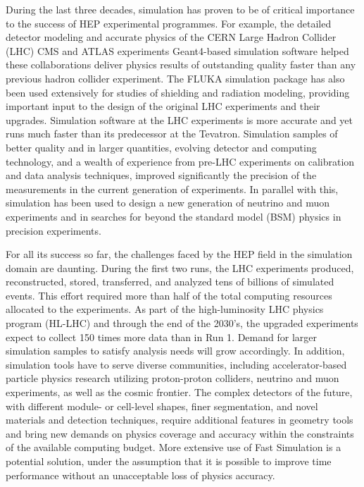 \documentclass[12pt,a4paper]{article}
\begin{document}
During the last three decades, simulation has proven to be of critical
importance to the success of HEP experimental programmes. For example,
the detailed detector modeling and accurate physics of the CERN Large
Hadron Collider (LHC) CMS and ATLAS experiments Geant4-based simulation
software helped these collaborations deliver physics results of
outstanding quality faster than any previous hadron collider experiment.
The FLUKA simulation package has also been used extensively for studies
of shielding and radiation modeling, providing important input to the
design of the original LHC experiments and their upgrades. Simulation
software at the LHC experiments is more accurate and yet runs much
faster than its predecessor at the Tevatron. Simulation samples of
better quality and in larger quantities, evolving detector and computing
technology, and a wealth of experience from pre-LHC experiments on
calibration and data analysis techniques, improved significantly the
precision of the measurements in the current generation of experiments.
In parallel with this, simulation has been used to design a new
generation of neutrino and muon experiments and in searches for beyond
the standard model (BSM) physics in precision experiments.

For all its success so far, the challenges faced by the HEP field in the
simulation domain are daunting. During the first two runs, the LHC
experiments produced, reconstructed, stored, transferred, and analyzed
tens of billions of simulated events. This effort required more than
half of the total computing resources allocated to the experiments. As
part of the high-luminosity LHC physics program (HL-LHC) and through the
end of the 2030's, the upgraded experiments expect to collect 150 times
more data than in Run 1. Demand for larger simulation samples to satisfy
analysis needs will grow accordingly. In addition, simulation tools have
to serve diverse communities, including accelerator-based particle
physics research utilizing proton-proton colliders, neutrino and muon
experiments, as well as the cosmic frontier. The complex detectors of
the future, with different module- or cell-level shapes, finer
segmentation, and novel materials and detection techniques, require
additional features in geometry tools and bring new demands on physics
coverage and accuracy within the constraints of the available computing
budget. More extensive use of Fast Simulation is a potential solution,
under the assumption that it is possible to improve time performance
without an unacceptable loss of physics accuracy.
\end{document}
